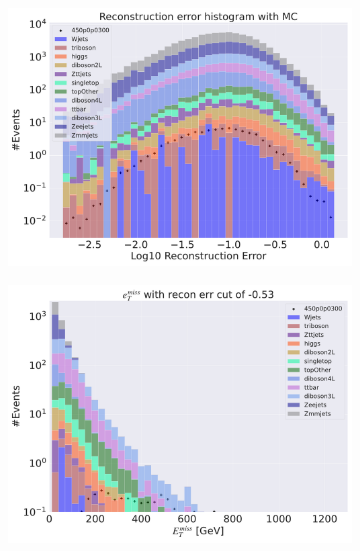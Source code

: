 \begin{figure}[H]
    \centering
    \begin{subfigure}{.40\textwidth}
        \includegraphics[width=\textwidth]{Figures/VAE_testing/small/3lep/b_data_recon_big_rm3_feats_sig_450p0p0300.pdf}
        \caption{ }
        \label{fig:VAE_3lep_small_450_3}
    \end{subfigure}
    \hfill
    \begin{subfigure}{.40\textwidth}
        \includegraphics[width=\textwidth]{Figures/VAE_testing/small/3lep/b_data_recon_big_rm3_feats_sig_450p0p0300_etmiss_recon_errcut_-0.53.pdf}
        \caption{}
        \label{fig:VAE_3lep_small_etmiss_450_3}
    \end{subfigure}

\end{figure}
